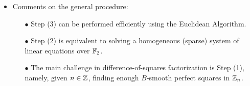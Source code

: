 \begin{itemize}
\begin{itemize}
\begin{enumerate}
				\end{enumerate}
		\item	Comments on the general procedure:
				\begin{itemize}
				\item[$\bullet$]	Step (3) can be performed efficiently using the Euclidean Algorithm.
				\item[$\bullet$]	Step (2) is equivalent to solving a homogeneous (sparse) system of
								linear equations over $\mathbb{F}_{2}$.
				\item[$\bullet$]	The main challenge in difference-of-squares factorization is Step (1),
								namely, given $n \in \mathbb{Z}$, finding enough $B$-smooth perfect squares
								in $\mathbb{Z}_{n}$.
				\end{itemize}
		\end{itemize}
\end{itemize}




